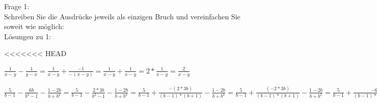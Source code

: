 \documentclass[12pt,a4paper]{article}
\begin{document}
Frage 1:
\\[2ex]
Schreiben Sie die Ausdrücke jeweils als einzigen Bruch und vereinfachen Sie soweit wie möglich:
\\[2ex]
Lösungen zu 1:

\begin{description}
<<<<<<< HEAD
\item[(a)]{$\frac{1}{x - y} - \frac{1}{y - x} = \frac{1}{x - y} + \frac{-1}{-(x - y)} = \frac{1}{x - y} + \frac{1}{x - y} = 2 * \frac{1}{x - y} = \frac{2}{x - y}$}
\item[(b)]{$\frac{5}{b - 1} - \frac{6b}{b^2 - 1} - \frac{1 - 2b}{b + b^2} = \frac{5}{b - 1} - \frac{2 * 3b}{b^2 - 1} - \frac{1 - 2b}{b + b^2} = \frac{5}{b - 1} + \frac{-(2 * 3b)}{(b - 1) * (b + 1)} - \frac{1 - 2b}{b + b^2} = \frac{5}{b - 1} + \frac{(-2 * 3b)}{(b - 1) * (b + 1)} - \frac{1 - 2b}{b + b^2} = \frac{5}{b - 1} + \frac{-6b}{(b - 1) * (b + 1)} - \frac{-2b + 1}{b + b^2} = \frac{5}{b - 1} + \frac{-6b}{(b - 1) * (b + 1)} + \frac{-(-2(b - 0,5))}{b * (b + 1)} = \frac{5}{b - 1} + \frac{-6b}{(b - 1) * (b + 1)} + \frac{(2(b - 0,5))}{b * (b + 1)} = \frac{5}{b - 1} + \frac{-6b}{(b - 1) * (b + 1)} + \frac{2b + 2 * (-0,5)}{b * (b + 1)} = \frac{5}{b - 1} + \frac{-6b}{(b - 1) * (b + 1)} + \frac{2b - 1}{b * (b + 1)} = \frac{5}{b - 1} + \frac{(-6b) * b}{(b - 1) * (b + 1) * b} + \frac{(2b - 1) * (b - 1)}{(b - 1) * (b + 1) * b} = \frac{5}{b - 1} + \frac{(-6b * b)}{(b - 1) * (b + 1) * b} + \frac{(2b - 1) * (b - 1)}{(b - 1) * (b + 1) * b} = \frac{5}{b - 1} + \frac{-6 * b^2}{(b - 1) * (b + 1) * b} + \frac{(2b - 1) * (b - 1)}{(b - 1) * (b + 1) * b} = \frac{5}{b - 1} + \frac{-6 * b^2}{(b - 1) * (b + 1) * b} + \frac{(2b * (b - 1) - (b - 1))}{(b - 1) * (b + 1) * b} = \frac{5}{b - 1} + \frac{-6 * b^2}{(b - 1) * (b + 1) * b} + \frac{(2(b * b + b * (-1)) - (b - 1))}{(b - 1) * (b + 1) * b} = \frac{5}{b - 1} + \frac{-6 * b^2}{(b - 1) * (b + 1) * b} + \frac{(2(b^2 - b) - (b - 1))}{(b - 1) * (b + 1) * b} = \frac{5}{b - 1} + \frac{-6 * b^2}{(b - 1) * (b + 1) * b} + \frac{((2 * b^2 + 2 * - b) - (b - 1))}{(b - 1) * (b + 1) * b} = \frac{5}{b - 1} + \frac{-6 * b^2}{(b - 1) * (b + 1) * b} + \frac{((2 * b^2 - 2b) - (b - 1))}{(b - 1) * (b + 1) * b} = \frac{5}{b - 1} + \frac{-6 * b^2}{(b - 1) * (b + 1) * b} + \frac{((2 * b^2 - 2b) + (-b + 1))}{(b - 1) * (b + 1) * b} = \frac{5}{b - 1} + \frac{-6 * b^2}{(b - 1) * (b + 1) * b} + \frac{(2 * b^2 - 2b + (-b + 1))}{(b - 1) * (b + 1) * b} = \frac{5}{b - 1} + \frac{-6 * b^2}{(b - 1) * (b + 1) * b} + \frac{(2 * b^2 - 2b - b + 1)}{(b - 1) * (b + 1) * b} = \frac{5}{b - 1} + \frac{-6 * b^2}{(b - 1) * (b + 1) * b} + \frac{2 * b^2 - 3b + 1}{(b - 1) * (b + 1) * b} = \frac{5}{b - 1} + \frac{-6 * b^2 + 2 * b^2 -3b + 1}{(b - 1) * (b + 1) * b} = \frac{5}{b - 1} + \frac{-4 * b^2 - 3b + 1}{(b - 1) * (b + 1) * b} = \frac{5}{b - 1} + \frac{-4b + 1}{(b - 1) * b} = \frac{5b}{(b - 1) * b} + \frac{-4b + 1}{(b - 1) * b} = \frac{5b - 4b + 1}{(b - 1) * b} = \frac{b + 1}{(b - 1) * b}$}

\end{description}
\end{document}
